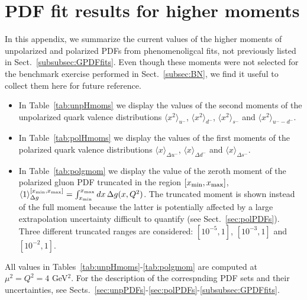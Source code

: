 \section{PDF fit results for higher moments }
\label{app:Hmoms}

In this appendix, we summarize the current values of the higher moments of 
unpolarized and polarized PDFs from phenomenoligcal fits, not previously 
listed in Sect.~\ref{subsubsec:GPDFfits}.
%
Even though these moments were not selected for the benchmark exercise 
performed in Sect.~\ref{subsec:BN}, we find it useful to collect them 
here for future reference.

\begin{itemize}

\item In Table~\ref{tab:unpHmoms} we display the values of the second moments 
of the unpolarized quark valence distributions $\langle x^2\rangle_{u^-}$, 
$\langle x^2\rangle_{d^-}$, $\langle x^2\rangle_{s^-}$ and 
$\langle x^2\rangle_{u^--d^-}$.

\item In Table~\ref{tab:polHmoms} we display the values of the first moments 
of the polarized quark valence distributions $\langle x\rangle_{\Delta u^-}$, 
$\langle x\rangle_{\Delta d^-}$ and $\langle x\rangle_{\Delta s^-}$.

\item In Table~\ref{tab:polgmom} we display the value of the zeroth moment
of the polarized gluon PDF truncated in the region $[x_{\rm min}, x_{\rm max}]$,
$\langle 1\rangle_{\Delta g}^{[x_{\rm min}, x_{\rm max}]}=\int_{x_{\rm min}}^{x_{\rm max}}dx\,\Delta g(x,Q^2)$.
%
The truncated moment is shown instead of the full moment
because the latter is potentially affected by a large extrapolation 
uncertainty difficult to quantify (see Sect.~\ref{sec:polPDFs}). 
%
Three different truncated ranges are considered: $[10^{-5},1]$,  $[10^{-3},1]$
and  $[10^{-2},1]$.

\end{itemize}
%
All values in Tables~\ref{tab:unpHmoms}-\ref{tab:polgmom} are computed at 
$\mu^2=Q^2=4$ GeV$^2$.
%
For the description of the correspnding PDF sets and their uncertainties, see
Sects.~\ref{sec:unpPDFs}-\ref{sec:polPDFs}-\ref{subsubsec:GPDFfits}.

